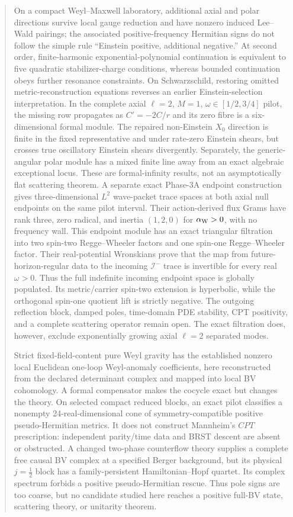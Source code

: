 \documentclass[11pt]{article}
\begin{document}
\begin{abstract}
On a compact Weyl--Maxwell laboratory, additional axial and polar directions
survive local gauge reduction and have nonzero induced Lee--Wald pairings;
the associated positive-frequency Hermitian signs do not follow the simple
rule ``Einstein positive, additional negative.''  At second order,
finite-harmonic exponential-polynomial continuation is equivalent to five
quadratic stabilizer-charge conditions, whereas bounded continuation obeys
further resonance constraints.  On Schwarzschild, restoring omitted
metric-reconstruction equations reverses an earlier Einstein-selection
interpretation.  In the complete axial $\ell=2$, $M=1$,
$\omega\in[1/2,3/4]$ pilot, the missing row propagates as $C'=-2C/r$ and its
zero fibre is a six-dimensional formal module.  The repaired non-Einstein
$X_0$ direction is finite in the fixed representative and under rate-zero
Einstein shears, but crosses true oscillatory Einstein shears divergently.
Separately, the generic-angular polar module has a mixed finite line away
from an exact algebraic exceptional locus.  These are formal-infinity
results, not an asymptotically flat scattering theorem.  A separate exact
Phase-3A endpoint construction gives three-dimensional \(L^2\) wave-packet trace
spaces at both axial null endpoints on the same pilot interval.  Their
action-derived flux Grams have rank three, zero radical, and inertia
\((1,2,0)\) for \(\alpha_{\rm W}>0\), with no frequency wall.  This endpoint
module has an exact triangular filtration into two spin-two
Regge--Wheeler factors and one spin-one Regge--Wheeler factor.  Their
real-potential Wronskians prove that the map from future-horizon-regular data
to the incoming \(\mathscr I^-\) trace is invertible for every real
\(\omega>0\).  Thus the full indefinite incoming endpoint space is globally
populated.  Its metric/carrier spin-two extension is hyperbolic, while the
orthogonal spin-one quotient lift is strictly negative.  The outgoing
reflection block, damped poles, time-domain PDE stability, CPT positivity,
and a complete scattering operator remain open.  The exact filtration does,
however, exclude exponentially growing axial \(\ell=2\) separated modes.

Strict fixed-field-content pure Weyl gravity has the established nonzero
local Euclidean one-loop Weyl-anomaly coefficients, here reconstructed from
the declared determinant complex and mapped into local BV cohomology.  A
formal compensator makes the cocycle exact but changes the theory.  On
selected compact reduced blocks, an exact pilot classifies a nonempty
24-real-dimensional cone of symmetry-compatible positive pseudo-Hermitian
metrics.  It does not construct Mannheim's $CPT$ prescription: independent
parity/time data and BRST descent are absent or obstructed.  A changed
two-phase counterflow theory supplies a complete free causal BV complex at a
specified Berger background, but its physical $j=\tfrac12$ block has a
family-persistent Hamiltonian--Hopf quartet.  Its complex spectrum forbids a
positive pseudo-Hermitian rescue.  Thus pole signs are too coarse, but no
candidate studied here reaches a positive full-BV state, scattering theory,
or unitarity theorem.
\end{abstract}
\end{document}
